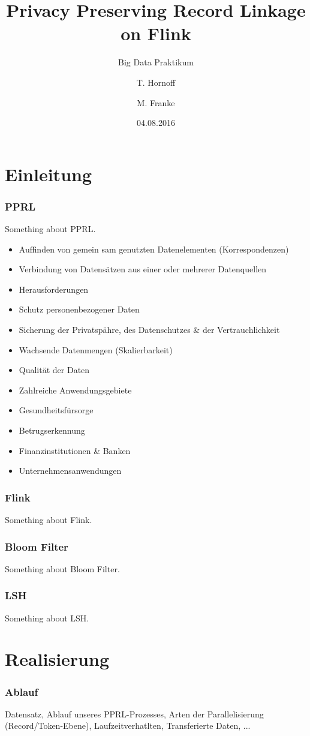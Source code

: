 \documentclass{beamer}
\title{Privacy Preserving Record Linkage on Flink}
\subtitle{Big Data Praktikum}
\author{T. Hornoff \and M. Franke}
\institute{Universität Leipzig \\ Abteilung Datenbanken}
\date{04.08.2016}
\begin{document}
	\frame{\titlepage}

	\section[Section]{Einleitung}
    
    \begin{frame}
    		\frametitle{PPRL}
         Something about PPRL.
         
         \begin{itemize}
         		\item Auffinden von gemein	sam genutzten Datenelementen (Korrespondenzen)
         		\item Verbindung von Datensätzen aus einer oder mehrerer Datenquellen
         		\item Herausforderungen
         		\item Schutz personenbezogener Daten
         		\item Sicherung der Privatspähre, des Datenschutzes \& der Vertrauchlichkeit
         		\item Wachsende Datenmengen (Skalierbarkeit)
         		\item Qualität der Daten
         		
         		\item Zahlreiche Anwendungsgebiete
         		\item Gesundheitsfürsorge
         		\item Betrugserkennung
         		\item Finanzinstitutionen \& Banken
         		\item Unternehmensanwendungen
         \end{itemize}
    \end{frame}
    
    \begin{frame}
    		\frametitle{Flink}
        	Something about Flink.
    \end{frame}

	\begin{frame}
    		\frametitle{Bloom Filter}
         Something about Bloom Filter.
    \end{frame}
    
    \begin{frame}
    		\frametitle{LSH}
         Something about LSH.
    \end{frame}
    \section[Section]{Realisierung}
    \begin{frame}
    		\frametitle{Ablauf}
    		Datensatz,
         Ablauf unseres PPRL-Prozesses,
         Arten der Parallelisierung (Record/Token-Ebene),
         Laufzeitverhatlten,
         Transferierte Daten,
         ...
    \end{frame}
    
\end{document}

